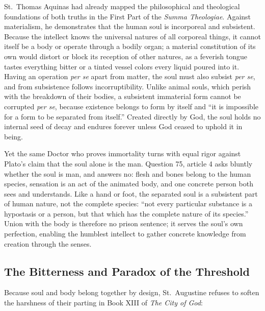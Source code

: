 St.~Thomas Aquinas had already mapped the philosophical and theological foundations of both truths in the First Part of the \emph{Summa Theologiae}. Against materialism, he demonstrates that the human soul is incorporeal and subsistent. Because the intellect knows the universal natures of all corporeal things, it cannot itself be a body or operate through a bodily organ; a material constitution of its own would distort or block its reception of other natures, as a feverish tongue tastes everything bitter or a tinted vessel colors every liquid poured into it. Having an operation \emph{per se} apart from matter, the soul must also subsist \emph{per se}, and from subsistence follows incorruptibility. Unlike animal souls, which perish with the breakdown of their bodies, a subsistent immaterial form cannot be corrupted \emph{per se}, because existence belongs to form by itself and ``it is impossible for a form to be separated from itself.'' Created directly by God, the soul holds no internal seed of decay and endures forever unless God ceased to uphold it in being.

Yet the same Doctor who proves immortality turns with equal rigor against Plato's claim that the soul alone is the man. Question 75, article 4 asks bluntly whether the soul is man, and answers no: flesh and bones belong to the human species, sensation is an act of the animated body, and one concrete person both sees and understands. Like a hand or foot, the separated soul is a subsistent part of human nature, not the complete species: ``not every particular substance is a hypostasis or a person, but that which has the complete nature of its species.'' Union with the body is therefore no prison sentence; it serves the soul's own perfection, enabling the humblest intellect to gather concrete knowledge from creation through the senses.

\subsection{The Bitterness and Paradox of the Threshold}

Because soul and body belong together by design, St.~Augustine refuses to soften the harshness of their parting in Book XIII of \emph{The City of God}:

